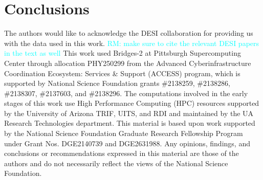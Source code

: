 \documentclass[reprint,superscriptaddress,showframe,nofootinbib,aps,prd,longbibliography,noeprint]{revtex4-2}
\newcommand{\rachel}[1]{{\textcolor{cyan}{RM: #1}}}
\begin{document}








\section{Conclusions}
\label{sec:conclusion}
\lipsum[1][1]

\begin{acknowledgments}
The authors would like to acknowledge the DESI collaboration for providing us with the data used in this work. \rachel{make sure to cite the relevant DESI papers in the text as well} This work used Bridges-2 \citep{Bridges2} at Pittsburgh Supercomputing Center through allocation PHY250299 from the Advanced Cyberinfrastructure Coordination Ecosystem: Services \& Support (ACCESS) program, which is supported by National Science Foundation grants \#2138259, \#2138286, \#2138307, \#2137603, and \#2138296. The computations involved in the early stages of this work use High Performance Computing (HPC) resources supported by the University of Arizona TRIF, UITS, and RDI and maintained by the UA Research Technologies department. This material is based upon work supported by the National Science Foundation Graduate Research Fellowship Program under Grant Nos. DGE2140739 and DGE2631988. Any opinions, findings, and conclusions or recommendations expressed in this material are those of the authors and do not necessarily reflect the views of the National Science Foundation.
\end{acknowledgments}



%
\end{document}

